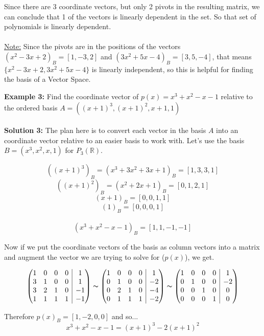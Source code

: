 \documentclass[12pt]{article}
\makeatletter
\newenvironment{amatrix}[1]{%
  \left(\begin{array}{@{}*{#1}{c}|c@{}}
}{%
  \end{array}\right)
}
\makeatother
\begin{document}
Since there are 3 coordinate vectors, but only 2 pivots in the resulting matrix, we can conclude that 1 of the vectors is linearly dependent in the set. So that set of polynomials is linearly dependent.\\
\\
\underline{Note:} Since the pivots are in the positions of the vectors $(x^2 - 3x + 2)_B = [1,-3,2]$ and $(3x^2 + 5x - 4)_B = [3,5,-4]$, that means $\{ x^2 - 3x + 2, 3x^2 + 5x - 4 \}$ is linearly independent, so this is helpful for finding the basis of a Vector Space.

\textbf{Example 3:} Find the coordinate vector of $p(x) = x^3 + x^2 - x - 1$ relative to the ordered basis $A = ((x+1)^3, (x+1)^2, x+1, 1)$\\
\\
\textbf{Solution 3:} The plan here is to convert each vector in the basis $A$ into an coordinate vector relative to an easier basis to work with. Let's use the basis $B = (x^3, x^2, x, 1)$ for $P_3 (\mathbb{R})$.

$$((x+1)^3)_B = (x^3 + 3x^2 + 3x + 1)_B = [1,3,3,1]$$
$$((x+1)^2)_B = (x^2 + 2x + 1)_B = [0,1,2,1]$$
$$(x+1)_B = [0,0,1,1]$$
$$(1)_B = [0,0,0,1]$$
\\
$$(x^3 + x^2 - x - 1)_B = [1,1,-1,-1]$$

Now if we put the coordinate vectors of the basis as column vectors into a matrix and augment the vector we are trying to solve for ($p(x)$), we get.

$$
\begin{amatrix}{4}
1 & 0 & 0 & 0 & 1\\
3 & 1 & 0 & 0 & 1\\
3 & 2 & 1 & 0 & -1\\
1 & 1 & 1 & 1 & -1
\end{amatrix}
\thicksim
\begin{amatrix}{4}
1 & 0 & 0 & 0 & 1\\
0 & 1 & 0 & 0 & -2\\
0 & 2 & 1 & 0 & -4\\
0 & 1 & 1 & 1 & -2
\end{amatrix}
\thicksim
\begin{amatrix}{4}
1 & 0 & 0 & 0 & 1\\
0 & 1 & 0 & 0 & -2\\
0 & 0 & 1 & 0 & 0\\
0 & 0 & 0 & 1 & 0
\end{amatrix}
$$

Therefore $p(x)_B = [1,-2,0,0]$ and so...
$$x^3 + x^2 - x - 1 = (x+1)^3 - 2(x+1)^2$$

\newpage
\end{document}
